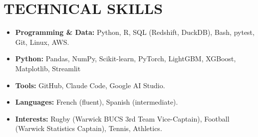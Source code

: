 \documentclass[10pt,a4paper]{article}
\begin{document}

\section*{TECHNICAL SKILLS}

\begin{itemize}
    \item \textbf{Programming \& Data:} Python, R, SQL (Redshift, DuckDB), Bash, pytest, Git, Linux, AWS.

    \item \textbf{Python:} Pandas, NumPy, Scikit-learn, PyTorch, LightGBM, XGBoost, Matplotlib, Streamlit

    \item \textbf{Tools:} GitHub, Claude Code, Google AI Studio.

    \item \textbf{Languages:} French (fluent), Spanish (intermediate).

    \item \textbf{Interests:} Rugby (Warwick BUCS 3rd Team Vice-Captain), Football (Warwick Statistics Captain), Tennis, Athletics.
\end{itemize}
\end{document}
